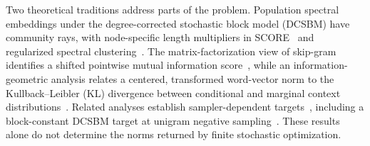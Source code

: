 \documentclass[aps,pre,reprint,superscriptaddress,longbibliography]{revtex4-2}
\begin{document}



Two theoretical traditions address parts of the problem.
Population spectral embeddings under the degree-corrected stochastic block model (DCSBM) have community rays, with node-specific length multipliers in SCORE~\citep{jin2015fast} and regularized spectral clustering~\citep{qin2013regularized}.
The matrix-factorization view of skip-gram identifies a shifted pointwise mutual information score~\citep{levy2014neural,qiu2018network}, while an information-geometric analysis relates a centered, transformed word-vector norm to the Kullback--Leibler (KL) divergence between conditional and marginal context distributions~\citep{oyama2022norm}.
Related analyses establish sampler-dependent targets~\citep{davison2023asymptotics}, including a block-constant DCSBM target at unigram negative sampling~\citep{davison2024community}.
These results alone do not determine the norms returned by finite stochastic optimization.
\end{document}

